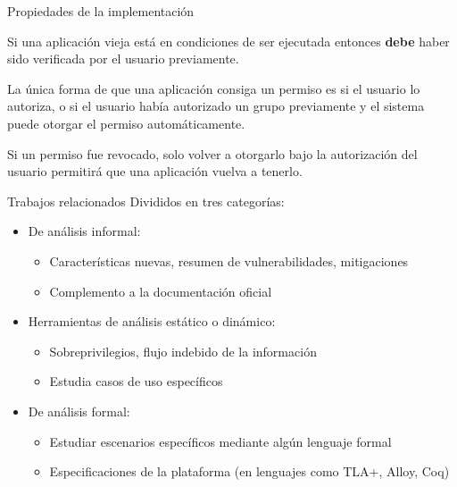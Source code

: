 \documentclass[pdf, handout]{beamer} %
\begin{document}
\begin{frame}{Propiedades de la implementación}
    \begin{prop}
        Si una aplicación vieja está en condiciones de ser ejecutada entonces \textbf{debe} haber
        sido verificada por el usuario previamente.
    \end{prop}

    \begin{prop}
        La única forma de que una aplicación consiga un permiso es si el usuario lo autoriza, o
        si el usuario había autorizado un grupo previamente y el sistema puede otorgar el permiso
        automáticamente.
    \end{prop}

    \begin{prop}
        Si un permiso fue revocado, solo volver a otorgarlo bajo la autorización del usuario
        permitirá que una aplicación vuelva a tenerlo.
    \end{prop}
\end{frame}

\begin{frame}{Trabajos relacionados}
    Divididos en tres categorías:
    \pause
    \begin{itemize}[<+->]
        \item De análisis informal:
              \begin{itemize}
                  \item Características nuevas, resumen de vulnerabilidades, mitigaciones
                  \item Complemento a la documentación oficial
              \end{itemize}
        \item Herramientas de análisis estático o dinámico:
              \begin{itemize}
                  \item Sobreprivilegios, flujo indebido de la información
                  \item Estudia casos de uso específicos
              \end{itemize}
        \item De análisis formal:
              \begin{itemize}
                  \item Estudiar escenarios específicos mediante algún lenguaje formal
                  \item Especificaciones de la plataforma (en lenguajes como TLA+, Alloy, Coq)
              \end{itemize}
    \end{itemize}
\end{frame}
\end{document}
